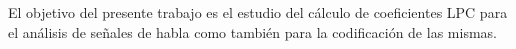 
El objetivo del presente trabajo es el estudio del cálculo de coeficientes LPC para el análisis de señales de habla como también para la codificación de las mismas.
